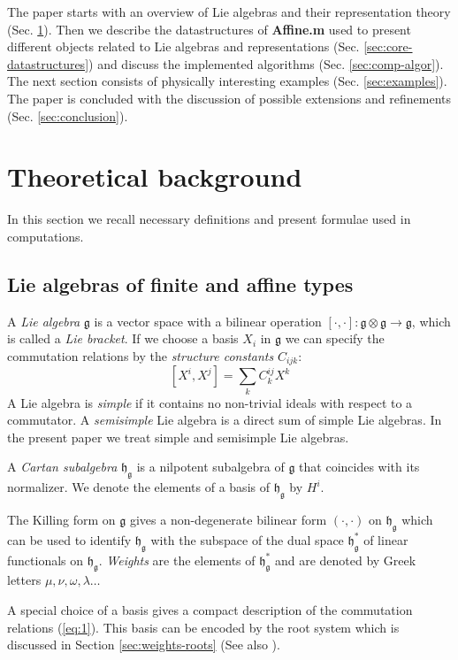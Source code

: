 \documentclass[preprint,12pt]{elsarticle}
\newcommand{\gf}{\mathfrak{g}}
\newcommand{\hf}{\mathfrak{h}}
\newcommand{\hfg}{\hf_{\gf}}
\begin{document}
The paper starts with an overview of Lie algebras and their representation theory (Sec. \ref{sec:theor-backgr}). Then we describe the datastructures of {\bf Affine.m} used to present different objects related to Lie algebras and representations (Sec. \ref{sec:core-datastructures}) and discuss the implemented algorithms (Sec. \ref{sec:comp-algor}). The next section consists of physically interesting examples (Sec. \ref{sec:examples}). The paper is concluded with the discussion of possible extensions and refinements (Sec. \ref{sec:conclusion}).

\section{Theoretical background}
\label{sec:theor-backgr}

In this section we recall necessary definitions and present formulae used in computations. 

\subsection{Lie algebras of finite and affine types}
\label{sec:lie-algebras-finite}

A {\it Lie algebra} $\gf$ is a vector space with a bilinear operation $[\cdot,\cdot]:\gf\otimes\gf\to \gf$, which is called a {\it Lie bracket}. If we choose a basis $X_{i}$ in $\gf$ we can specify the commutation relations by the {\it structure constants} $C_{ijk}$:
\begin{equation}
  \label{eq:1}
  [X^{i},X^{j}]=\sum_{k} C^{ij}_{k} X^{k}
\end{equation}
A Lie algebra is {\it simple} if it contains no non-trivial ideals with respect to a commutator. A {\it semisimple} Lie algebra is a direct sum of simple Lie algebras. In the present paper we treat simple and semisimple Lie algebras. 

A {\it Cartan subalgebra}  $\hfg$ is a nilpotent subalgebra of  $\gf$ that coincides with its normalizer. 
We denote the elements of a basis of $\hfg$ by $H^{i}$.

The Killing form on $\gf$ gives a non-degenerate bilinear form $(\cdot,\cdot)$ on $\hfg$ which can be used to identify $\hfg$ with the subspace of the dual space $\hfg^{*}$ of linear functionals on $\hfg$. {\it Weights} are the elements of $\hfg^{*}$ and are denoted by Greek letters $\mu,\nu, \omega, \lambda\dots$

A special choice of a basis gives a compact description of the commutation relations (\ref{eq:1}). This basis can be encoded by the root system which is discussed in Section \ref{sec:weights-roots} (See also \cite{humphreys1997introduction,humphreys1992reflection}).
\end{document}
